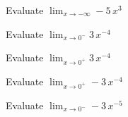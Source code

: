 \documentclass{ximera}
\begin{document}
\begin{question}

Evaluate $\lim_{x \to -\infty} -5 \, x^3$

\begin{multipleChoice}
\choice {$-\infty$}
\choice [correct]{$\infty$}
\end{multipleChoice}
\end{question}









\begin{question}

Evaluate $\lim_{x \to 0^-} 3 \, x^{-4}$

\begin{multipleChoice}
\choice {$-\infty$}
\choice [correct]{$\infty$}
\end{multipleChoice}
\end{question}




\begin{question}

Evaluate $\lim_{x \to 0^+} 3 \, x^{-4}$

\begin{multipleChoice}
\choice {$-\infty$}
\choice [correct]{$\infty$}
\end{multipleChoice}
\end{question}




\begin{question}

Evaluate $\lim_{x \to 0^+} -3 \, x^{-4}$

\begin{multipleChoice}
\choice [correct]{$-\infty$}
\choice {$\infty$}
\end{multipleChoice}
\end{question}




\begin{question}

Evaluate $\lim_{x \to 0^-} -3 \, x^{-5}$

\begin{multipleChoice}
\choice {$-\infty$}
\choice [correct]{$\infty$}
\end{multipleChoice}
\end{question}
\end{document}
